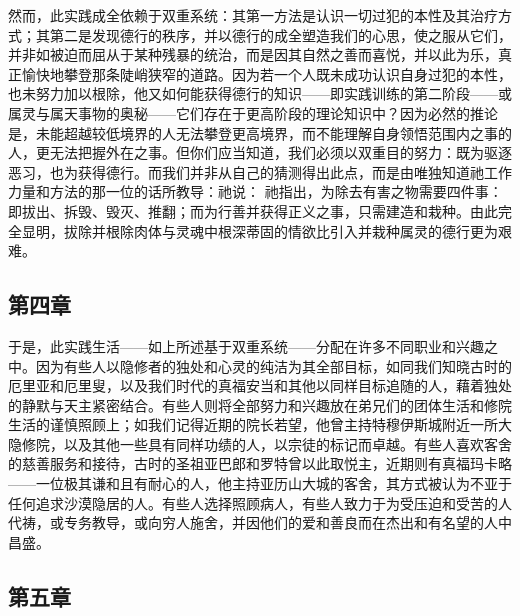 然而，此实践成全依赖于双重系统：其第一方法是认识一切过犯的本性及其治疗方式；其第二是发现德行的秩序，并以德行的成全塑造我们的心思，使之服从它们，并非如被迫而屈从于某种残暴的统治，而是因其自然之善而喜悦，并以此为乐，真正愉快地攀登那条陡峭狭窄的道路。因为若一个人既未成功认识自身过犯的本性，也未努力加以根除，他又如何能获得德行的知识——即实践训练的第二阶段——或属灵与属天事物的奥秘——它们存在于更高阶段的理论知识中？因为必然的推论是，未能超越较低境界的人无法攀登更高境界，而不能理解自身领悟范围内之事的人，更无法把握外在之事。但你们应当知道，我们必须以双重目的努力：既为驱逐恶习，也为获得德行。而我们并非从自己的猜测得出此点，而是由唯独知道祂工作力量和方法的那一位的话所教导：祂说：  祂指出，为除去有害之物需要四件事：即拔出、拆毁、毁灭、推翻；而为行善并获得正义之事，只需建造和栽种。由此完全显明，拔除并根除肉体与灵魂中根深蒂固的情欲比引入并栽种属灵的德行更为艰难。\par


\subsection{第四章}

\par

于是，此实践生活——如上所述基于双重系统——分配在许多不同职业和兴趣之中。因为有些人以隐修者的独处和心灵的纯洁为其全部目标，如同我们知晓古时的厄里亚和厄里叟，以及我们时代的真福安当和其他以同样目标追随的人，藉着独处的静默与天主紧密结合。有些人则将全部努力和兴趣放在弟兄们的团体生活和修院生活的谨慎照顾上；如我们记得近期的院长若望，他曾主持特穆伊斯城附近一所大隐修院，以及其他一些具有同样功绩的人，以宗徒的标记而卓越。有些人喜欢客舍的慈善服务和接待，古时的圣祖亚巴郎和罗特曾以此取悦主，近期则有真福玛卡略——一位极其谦和且有耐心的人，他主持亚历山大城的客舍，其方式被认为不亚于任何追求沙漠隐居的人。有些人选择照顾病人，有些人致力于为受压迫和受苦的人代祷，或专务教导，或向穷人施舍，并因他们的爱和善良而在杰出和有名望的人中昌盛。\par


\subsection{第五章}

